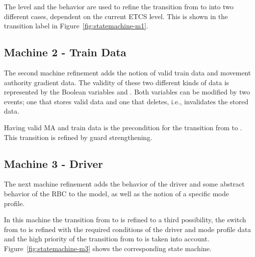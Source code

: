 \documentclass{template/openetcs_article}
\begin{document}
The level and the behavior are used to refine the transition from  to
 into two different cases, dependent on the current ETCS level. This is
shown in the transition label in Figure~\ref{fig:statemachine-m1}.



\subsection{Machine 2 - Train Data}
\label{sec:machine-2-train}

The second machine refinement adds the notion of valid train data and movement
authority gradient data. The validity of these two different kinds of data is
represented by the Boolean variables  and
. Both variables can be modified by two events;
one that stores valid data and one that deletes, i.e., invalidates the stored
data.


Having valid MA and train data is the precondition for the transition from
 to . This transition is refined by guard strengthening.



\subsection{Machine 3 - Driver}
\label{sec:machine-3-driver}

The next machine refinement adds the behavior of the driver and some abstract
behavior of the RBC to the model, as well as the notion of a specific mode
profile.

In this machine the transition from  to  is refined to a third
possibility, the switch from  to  is refined with the required
conditions of the driver and mode profile data and the high priority of the
transition from  to  is taken into
account. Figure~\ref{fig:statemachine-m3} shows the corresponding state machine.
\end{document}
